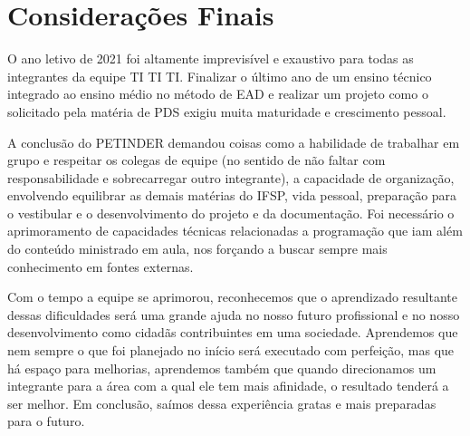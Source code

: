 \chapter{Considerações Finais}
O ano letivo de 2021 foi altamente imprevisível e exaustivo para todas as integrantes da equipe TI TI TI. Finalizar o último ano de um ensino técnico integrado ao ensino médio no método de \ac{EAD} e realizar um projeto como o solicitado pela matéria de \ac{PDS} exigiu muita maturidade e crescimento pessoal.

A conclusão do PETINDER demandou coisas como a habilidade de trabalhar em grupo e respeitar os colegas de equipe (no sentido de não faltar com responsabilidade e sobrecarregar outro integrante), a capacidade de organização, envolvendo equilibrar as demais matérias do \ac{IFSP}, vida pessoal, preparação para o vestibular e o desenvolvimento do projeto e da documentação. Foi necessário o aprimoramento de capacidades técnicas relacionadas a programação que iam além do conteúdo ministrado em aula, nos forçando a buscar sempre mais conhecimento em fontes externas.

Com o tempo a equipe se aprimorou, reconhecemos que o aprendizado resultante dessas dificuldades será uma grande ajuda no nosso futuro profissional e no nosso desenvolvimento como cidadãs contribuintes em uma sociedade. Aprendemos que nem sempre o que foi planejado no início será executado com perfeição, mas que há espaço para melhorias, aprendemos também que quando direcionamos um integrante para a área com a qual ele tem mais afinidade, o resultado tenderá a ser melhor. Em conclusão, saímos dessa experiência gratas e mais preparadas para o futuro.

